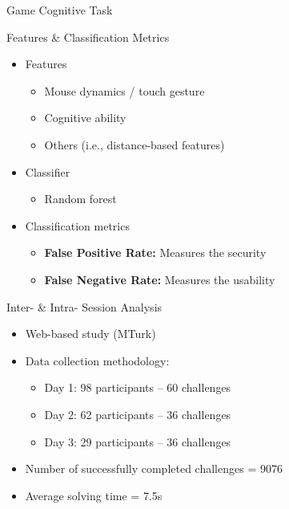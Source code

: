 \begin{frame}{Game Cognitive Task}

\begin{center}
	
	
\end{center}


\end{frame}


\begin{frame}{Features \& Classification Metrics}
\begin{itemize}
\item Features
\begin{itemize}
\item Mouse dynamics / touch gesture  
\item Cognitive ability
\item Others (i.e., distance-based features)
\end{itemize}

\item Classifier
\begin{itemize}
\item Random forest
\end{itemize}

\item Classification metrics 
\begin{itemize}
\item \textbf{False Positive Rate: } Measures the security 
\item \textbf{False Negative Rate:} Measures the usability

\end{itemize}
\end{itemize}

\end{frame}



\begin{frame}{Inter- \& Intra- Session Analysis}
\begin{itemize}
\item Web-based study (MTurk)
\item Data collection methodology:
\begin{itemize}
\item Day 1: 98 participants -- 60 challenges
\item Day 2: 62 participants -- 36 challenges
\item Day 3: 29 participants -- 36 challenges
\end{itemize}

\item Number of successfully completed challenges = 9076
\item Average solving time = 7.5s
\end{itemize}

\end{frame}



